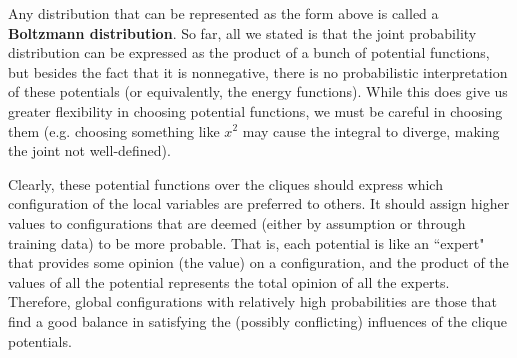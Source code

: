 \documentclass{article}
\begin{document}
  Any distribution that can be represented as the form above is called a \textbf{Boltzmann distribution}. So far, all we stated is that the joint probability distribution can be expressed as the product of a bunch of potential functions, but besides the fact that it is nonnegative, there is no probabilistic interpretation of these potentials (or equivalently, the energy functions). While this does give us greater flexibility in choosing potential functions, we must be careful in choosing them (e.g. choosing something like $x^2$ may cause the integral to diverge, making the joint not well-defined).

  Clearly, these potential functions over the cliques should express which configuration of the local variables are preferred to others. It should assign higher values to configurations that are deemed (either by assumption or through training data) to be more probable. That is, each potential is like an ``expert" that provides some opinion (the value) on a configuration, and the product of the values of all the potential represents the total opinion of all the experts. Therefore, global configurations with relatively high probabilities are those that find a good balance in satisfying the (possibly conflicting) influences of the clique potentials. 
\end{document}
